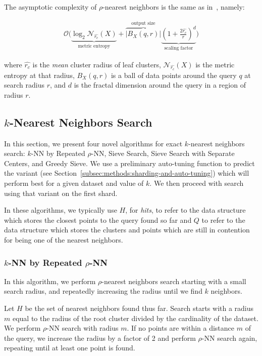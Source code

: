 The asymptotic complexity of $\rho$-nearest neighbors is the same as in~\cite{ishaq2019clustered}, namely:

\begin{gather}
    \mathcal{O}\Bigg(
    \underbrace{\log_2 \mathcal{N}_{\hat{r_c}}(X)}_{\textrm{metric entropy}} +
    \overbrace{\left|B_X(q,r)\right|}^{\textrm{output size}}
    \underbrace{\left(1+\frac{2\hat{r_c}}{r}\right)^d}_{\textrm{scaling factor}}\Bigg)
    \label{hierarchical-complexity}
\end{gather}

where $\hat{r_c}$ is the \textit{mean} cluster radius of leaf clusters, $\mathcal{N}_{\hat{r_c}}(X)$ is the metric entropy at that radius, $B_X(q,r)$ is a ball of data points around the query $q$ at search radius $r$, and $d$ is the fractal dimension around the query in a region of radius $r$.


\subsection{\texorpdfstring{$k$}{k}-Nearest Neighbors Search}
\label{subsec:methods:knn-search}

In this section, we present four novel algorithms for exact $k$-nearest neighbors search: $k$-NN by Repeated $\rho$-NN, Sieve Search, Sieve Search with Separate Centers, and Greedy Sieve. 
We use a preliminary auto-tuning function to predict the variant (see Section~\ref{subsec:methods:sharding-and-auto-tuning}) which will perform 
best for a given dataset and value of $k$.
We then proceed with search using that variant on the first shard. 

In these algorithms, we typically use $H$, for \emph{hits}, to refer to the data structure which stores the closest points to the query found so far and
$Q$ to refer to the data structure which stores the clusters and points which are still in contention for being one of the nearest neighbors.


\subsubsection{\texorpdfstring{$k$}{k}-NN by Repeated \texorpdfstring{$\rho$}{p}-NN}
\label{subsubsec:methods:knn-search:repeated-rnn}

In this algorithm, we perform $\rho$-nearest neighbors search starting with a small search radius, and repeatedly increasing the radius until we find $k$ neighbors.

Let $H$ be the set of nearest neighbors found thus far.
Search starts with a radius $m$ equal to the radius of the root cluster divided by the cardinality of the dataset.
We perform $\rho$-NN search with radius $m$. 
If no points are within a distance $m$ of the query, we increase the radius by a factor of 2 and perform $\rho$-NN search again, repeating until at least one point is found.

